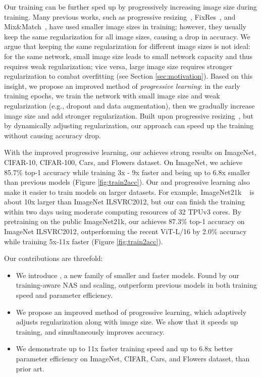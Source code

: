 \documentclass{article}
\begin{document}
Our training can be further sped up by progressively increasing image size during training. Many previous works, such as progressive resizing~\cite{fastaidawnbench}, FixRes~\cite{fixres20}, and Mix\&Match~\cite{mixmatch19}, have used smaller image sizes in training; however, they usually keep the same regularization for all image sizes, causing a drop in accuracy. We argue that keeping the same regularization for different image sizes is not ideal: for the same network, small image size leads to small network capacity and thus requires weak
regularization; vice versa, large image size requires stronger regularization to combat overfitting (see Section \ref{sec:motivation}). Based on this insight, we propose an improved method of \emph{progressive learning}: in the early training epochs, we train the network with small image size and weak regularization (e.g., dropout and data augmentation), then we gradually increase  image size and add stronger regularization. Built upon progressive resizing~\cite{fastaidawnbench}, but by dynamically adjusting regularization, our approach can speed up the training without causing accuracy drop.






With the improved progressive learning, our {\xnet} achieves 
strong results  on ImageNet, CIFAR-10, CIFAR-100, Cars, and Flowers dataset. On ImageNet, we achieve 85.7\% top-1 accuracy while training 3x - 9x faster and being up to 6.8x smaller than previous models (Figure \ref{fig:train2acc}). 
Our {\xnet} and progressive learning also make it easier to train models on larger datasets. For example, ImageNet21k ~\cite{imagenet15} is about 10x larger than ImageNet ILSVRC2012, but our {\xnet} can finish the training within two days using moderate computing resources of 32 TPUv3 cores. By pretraining on the public ImageNet21k, our {\xnet} achieves 87.3\% top-1 accuracy on ImageNet ILSVRC2012, outperforming the recent ViT-L/16 by 2.0\% accuracy while training 5x-11x faster (Figure \ref{fig:train2acc}).

Our contributions are threefold: 
\begin{itemize}
\item We introduce {\xnet}, a new family of smaller and faster models. Found by our training-aware NAS and scaling,  {\xnet} outperform previous models in both training speed and parameter efficiency.

    \item We propose an improved method of progressive learning, which adaptively adjusts regularization along with image size. We show that it speeds up training, and simultaneously improves accuracy.

    \item We demonstrate up to 11x faster training speed and up to 6.8x better parameter efficiency on ImageNet, CIFAR, Cars, and Flowers dataset, than prior art.
\end{itemize}
\end{document}
